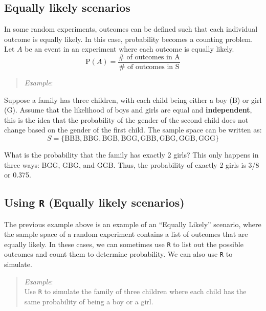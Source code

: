 \documentclass[
]{book}
\begin{document}
\hypertarget{equally-likely-scenarios}{%
\subsection{Equally likely scenarios}\label{equally-likely-scenarios}}

In some random experiments, outcomes can be defined such that each individual outcome is equally likely. In this case, probability becomes a counting problem. Let \(A\) be an event in an experiment where each outcome is equally likely.
\[
\mbox{P}(A)=\frac{\mbox{# of outcomes in A}}{\mbox{# of outcomes in S}}
\]

\begin{quote}
\emph{Example}:
\end{quote}

Suppose a family has three children, with each child being either a boy (B) or girl (G). Assume that the likelihood of boys and girls are equal and \textbf{independent}, this is the idea that the probability of the gender of the second child does not change based on the gender of the first child. The sample space can be written as:
\[
S=\{\mbox{BBB},\mbox{BBG},\mbox{BGB},\mbox{BGG},\mbox{GBB},\mbox{GBG},\mbox{GGB},\mbox{GGG}\}
\]

What is the probability that the family has exactly 2 girls? This only happens in three ways: BGG, GBG, and GGB. Thus, the probability of exactly 2 girls is 3/8 or 0.375.

\hypertarget{using-r-equally-likely-scenarios}{%
\subsection{\texorpdfstring{Using \texttt{R} (Equally likely scenarios)}{Using R (Equally likely scenarios)}}\label{using-r-equally-likely-scenarios}}

The previous example above is an example of an ``Equally Likely'' scenario, where the sample space of a random experiment contains a list of outcomes that are equally likely. In these cases, we can sometimes use \texttt{R} to list out the possible outcomes and count them to determine probability. We can also use \texttt{R} to simulate.

\begin{quote}
\emph{Example}:\\
Use \texttt{R} to simulate the family of three children where each child has the same probability of being a boy or a girl.
\end{quote}
\end{document}
